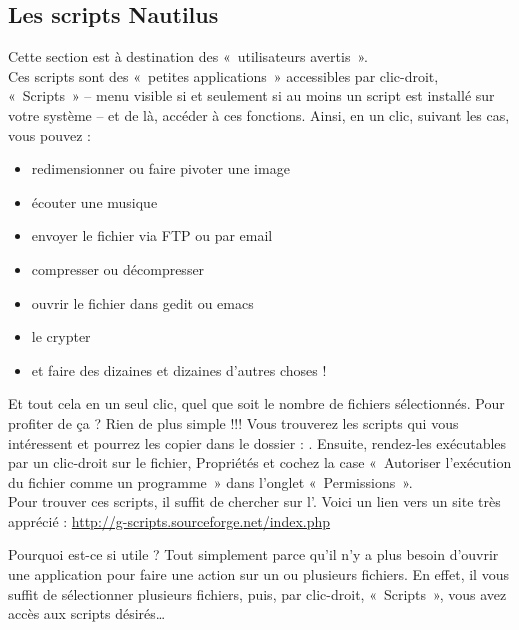 \subsection{Les scripts Nautilus}
Cette section est à destination des «~utilisateurs avertis~».\\
Ces scripts sont des «~petites applications~» accessibles par clic-droit, «~Scripts~» -- menu visible si et seulement si au moins un script est installé sur votre système -- et de là, accéder à ces fonctions. Ainsi, en un clic, suivant les cas, vous pouvez :\par
\begin{itemize}
\item redimensionner ou faire pivoter une image 
\item écouter une musique 
\item envoyer le fichier via FTP ou par email 
\item compresser ou décompresser 
\item ouvrir le fichier dans gedit ou emacs 
\item le crypter 
\item et faire des dizaines et dizaines d'autres choses ! 
\end{itemize}
Et tout cela en un seul clic, quel que soit le nombre de fichiers sélectionnés. Pour profiter de ça ? Rien de plus simple !!! Vous trouverez les scripts qui vous intéressent et pourrez les copier dans le dossier : . Ensuite, rendez-les exécutables par un clic-droit sur le fichier, Propriétés et cochez la case «~Autoriser l'exécution du fichier comme un programme~» dans l'onglet «~Permissions~».\\
Pour trouver ces scripts, il suffit de chercher sur l'. Voici un lien vers un site  très apprécié : \url{http://g-scripts.sourceforge.net/index.php}\par
Pourquoi est-ce si utile ? Tout simplement parce qu'il n'y a plus besoin d'ouvrir une application pour faire une action sur un ou plusieurs fichiers. En effet, il vous suffit de sélectionner plusieurs fichiers, puis, par clic-droit,  «~Scripts~», vous avez accès aux scripts désirés\ldots{}
